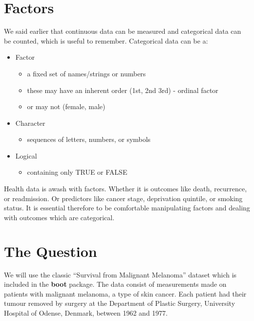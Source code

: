 \documentclass[
  12pt,
  krantz2]{krantz}
\providecommand{\tightlist}{%
  \setlength{\itemsep}{0pt}\setlength{\parskip}{0pt}}
\begin{document}
\hypertarget{factors}{%
\section{Factors}\label{factors}}


We said earlier that continuous data can be measured and categorical data can be counted, which is useful to remember.
Categorical data can be a:

\begin{itemize}
\tightlist
\item
  Factor

  \begin{itemize}
  \tightlist
  \item
    a fixed set of names/strings or numbers
  \item
    these may have an inherent order (1st, 2nd 3rd) - ordinal factor
  \item
    or may not (female, male)
  \end{itemize}
\item
  Character

  \begin{itemize}
  \tightlist
  \item
    sequences of letters, numbers, or symbols
  \end{itemize}
\item
  Logical

  \begin{itemize}
  \tightlist
  \item
    containing only TRUE or FALSE
  \end{itemize}
\end{itemize}

Health data is awash with factors.
Whether it is outcomes like death, recurrence, or readmission.
Or predictors like cancer stage, deprivation quintile, or smoking status.
It is essential therefore to be comfortable manipulating factors and dealing with outcomes which are categorical.

\hypertarget{the-question-4}{%
\section{The Question}\label{the-question-4}}

We will use the classic ``Survival from Malignant Melanoma'' dataset which is included in the \textbf{boot} package.
The data consist of measurements made on patients with malignant melanoma, a type of skin cancer.
Each patient had their tumour removed by surgery at the Department of Plastic Surgery, University Hospital of Odense, Denmark, between 1962 and 1977.
\end{document}
